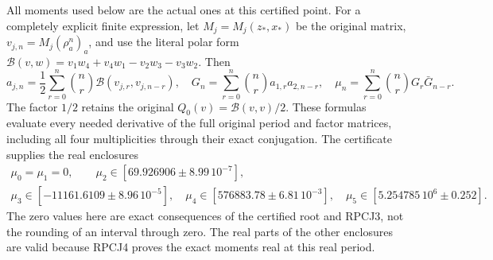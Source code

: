 All moments used below are the actual ones at this certified point.
For a completely explicit finite expression, let $M_j=M_j(z_*,x_*)$
be the original matrix, $v_{j,n}=M_j(\rho_a^n)_a$, and use the
literal polar form
$\mathcal B(v,w)=v_1w_4+v_4w_1-v_2w_3-v_3w_2$.
Then
\[
 a_{j,n}=\frac12\sum_{r=0}^n\binom nr
            \mathcal B(v_{j,r},v_{j,n-r}),\quad
 G_n=\sum_{r=0}^n\binom nr a_{1,r}a_{2,n-r},\quad
 \mu_n=\sum_{r=0}^n\binom nrG_r\bar G_{n-r}.
 \tag{RPE2}
\]
The factor $1/2$ retains the original $Q_0(v)=\mathcal B(v,v)/2$.
These formulas evaluate every needed derivative of the full original
period and factor matrices, including all four multiplicities through
their exact conjugation. The certificate supplies the real enclosures
\[
 \begin{gathered}
 \mu_0=\mu_1=0,\qquad
 \mu_2\in[69.926906\mathbin\pm8.99\,10^{-7}],\\
 \mu_3\in[-11161.6109\mathbin\pm8.96\,10^{-5}],\quad
 \mu_4\in[576883.78\mathbin\pm6.81\,10^{-3}],\quad
 \mu_5\in[5.254785\,10^6\mathbin\pm0.252].
 \end{gathered}\tag{RPE3}
\]
The zero values here are exact consequences of the certified root
and RPCJ3, not the rounding of an interval through zero.
The real parts of the other enclosures are valid because RPCJ4
proves the exact moments real at this real period.

